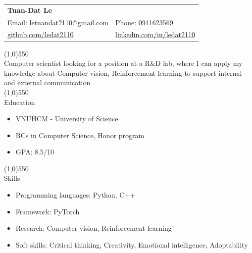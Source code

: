 \documentclass[a4paper, 12pt]{article}
\begin{document}
\begin{vwcol}[widths={0.2, 0.8}]

  \hspace{0pt}
  \vfill
  \begin{tabular}{l|l}
    \multicolumn{2}{l}{\Huge{\textbf{\textcolor[rgb]{0.5,0.8,0.4}{Tuan-Dat Le}}}}
    \vspace{5mm}\\
    Email: letuandat2110@gmail.com & Phone: 0941623569 \\
    \url{github.com/ledat2110} & \url{linkedin.com/in/ledat2110}
  \end{tabular}
  \vfill
  \hspace{0pt}
\end{vwcol}

\line(1,0){550}\\
Computer scientist looking for a position at a R\&D lab, where I can apply my knowledge about Computer vision, Reinforcement learning to support internal and external communication \\

\line(1,0){550}\\
\vspace{3mm}
{\huge Education}
\begin{itemize}
    \item VNUHCM - University of Science
    \item BCs in Computer Science, Honor program
    \item GPA: 8.5/10
\end{itemize}

\line(1,0){550}\\
\vspace{3mm}
{\huge Skills}
\begin{itemize}
    \item Programming languages: Python, C++
    \item Framework: PyTorch
    \item Research: Computer vision, Reinforcement learning
    \item Soft skills: Critical thinking, Creativity, Emotional intelligence, Adoptability
\end{itemize}
\end{document}
